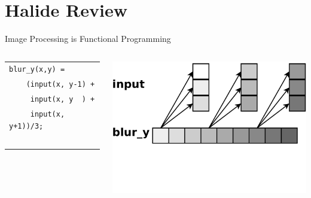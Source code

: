 \documentclass[xcolor=dvipsnames]{beamer}
\begin{document}
\section{Halide Review}

\newcommand\code[1]{{\begin{center}\fbox{\begin{tabular}{l} #1 \end{tabular}} \end{center}}}


\begin{frame}{Image Processing is Functional Programming}
	\begin{columns}

	\begin{tabular}{l}
		\texttt{blur\_y(x,y) =} \\
		\texttt{~~~~(input(x, y-1) +}\\
		\texttt{~~~~~input(x, y~~) +}\\
		\texttt{~~~~~input(x, y+1))/3;}\\
		\\
		\\
		\\
		\\
		\\
	\end{tabular}

	\includegraphics[width=\textwidth]{blury.pdf}
	\end{columns}
\end{frame}
\end{document}
